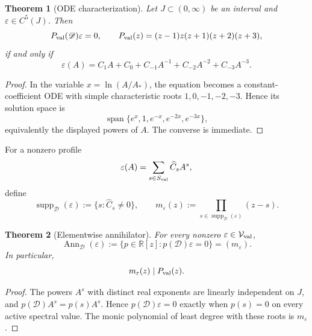 \documentclass[aps,prd,reprint,onecolumn,nofootinbib,superscriptaddress,showkeys]{revtex4-2}
\numberwithin{equation}{section}
\theoremstyle{definition}
\theoremstyle{plain}
\newtheorem{theorem}{Theorem}[section]
\newcommand{\R}{\mathbb R}
\newcommand{\Dil}{\mathscr D}
\newcommand{\Ann}{\operatorname{Ann}}
\newcommand{\spanop}{\operatorname{span}}
\begin{document}
\begin{theorem}[ODE characterization]
Let \(J\subset(0,\infty)\) be an interval and \(\varepsilon\in C^5(J)\).  Then
\begin{equation}
P_{\rm val}(\Dil)\varepsilon=0,
\qquad
P_{\rm val}(z)=(z-1)z(z+1)(z+2)(z+3),
\end{equation}
if and only if
\begin{equation}
\varepsilon(A)
=
C_1A+C_0+C_{-1}A^{-1}+C_{-2}A^{-2}+C_{-3}A^{-3}.
\end{equation}
\end{theorem}

\begin{proof}
In the variable \(x=\ln(A/A_*)\), the equation becomes a constant-coefficient ODE with simple characteristic roots \(1,0,-1,-2,-3\).  Hence its solution space is
\[
\spanop\{e^x,1,e^{-x},e^{-2x},e^{-3x}\},
\]
equivalently the displayed powers of \(A\).  The converse is immediate.
\end{proof}

For a nonzero profile
\begin{equation}
\varepsilon(A)=\sum_{s\in S_{\rm val}}\widehat C_sA^s,
\end{equation}
define
\begin{equation}
\operatorname{supp}_{\Dil}(\varepsilon)
:=
\{s:\widehat C_s\ne0\},
\qquad
m_\varepsilon(z)
:=
\prod_{s\in\operatorname{supp}_{\Dil}(\varepsilon)}(z-s).
\end{equation}

\begin{theorem}[Elementwise annihilator]
For every nonzero \(\varepsilon\in\mathcal V_{\rm val}\),
\begin{equation}
\Ann_{\Dil}(\varepsilon)
:=
\{p\in\R[z]:p(\Dil)\varepsilon=0\}
=
(m_\varepsilon).
\end{equation}
In particular,
\begin{equation}
m_\varepsilon(z)\mid P_{\rm val}(z).
\end{equation}
\end{theorem}

\begin{proof}
The powers \(A^s\) with distinct real exponents are linearly independent on \(J\), and \(p(\Dil)A^s=p(s)A^s\).  Hence \(p(\Dil)\varepsilon=0\) exactly when \(p(s)=0\) on every active spectral value.  The monic polynomial of least degree with these roots is \(m_\varepsilon\).
\end{proof}
\end{document}
